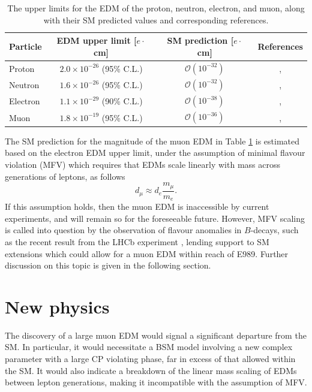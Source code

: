 \begin{table}[t!]
\centering
\begin{tabular}{l|ccc}
\hline
\hline
 Particle & EDM upper limit [$e\cdot$cm] & SM prediction [$e\cdot$cm] & References \\ 
\hline
 Proton & $2.0\times10^{-26}$ (95\% C.L.) & $\mathcal{O}(10^{-32})$ & \cite{199HgEDMLimits}, \cite{ProtonNeutronEDMPred}  \\ 
 Neutron & $1.6\times10^{-26}$ (95\% C.L.) & $\mathcal{O}(10^{-32})$ &  \cite{199HgEDMLimits}, \cite{ProtonNeutronEDMPred}  \\
Electron & $1.1\times10^{-29}$ (90\% C.L.) & $\mathcal{O}(10^{-38})$ & \cite{ImprovedElectronEDMLimit}, \cite{ElectronEDMPred} \\
 Muon & $1.8\times10^{-19}$ (95\% C.L.) & $\mathcal{O}(10^{-36})$ & \cite{BNLEDM}, \cite{ElectronEDMPred} \\
\hline
\hline
\end{tabular}
\caption{The upper limits for the EDM of the proton, neutron, electron, and muon, along with their SM predicted values and corresponding references.}
\label{tbl:ParticleEDMs}
\end{table}

The SM prediction for the magnitude of the muon EDM in Table \ref{tbl:ParticleEDMs} is estimated based on the electron EDM upper limit, under the assumption of minimal flavour violation (MFV) \cite{MFV} which requires that EDMs scale linearly with mass across generations of leptons, as follows
%
\begin{equation}
  d_{\mu} \approx d_{e}\frac{m_{\mu}}{m_{e}}.
  \label{eqn:EDMMassScaling}
\end{equation}
%
If this assumption holds, then the muon EDM is inaccessible by current experiments, and will remain so for the foreseeable future. However, MFV scaling is called into question by the observation of flavour anomalies in $B$-decays, such as the recent result from the LHCb experiment \cite{LHCb2021}, lending support to SM extensions which could allow for a muon EDM within reach of E989. Further discussion on this topic is given in the following section. 

\section{New physics}\label{sec:NewPhysics}

The discovery of a large muon EDM would signal a significant departure from the SM. In particular, it would necessitate a BSM model involving a new complex parameter with a large CP violating phase, far in excess of that allowed within the SM. It would also indicate a breakdown of the linear mass scaling of EDMs between lepton generations, making it incompatible with the assumption of MFV. 

